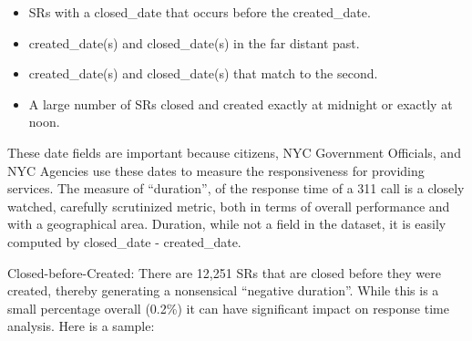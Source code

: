 \documentclass[12pt, titlepage]{article}
\begin{document}
\begin{itemize}
	\item SRs with a closed\_date that occurs before the created\_date.
 	\item created\_date(s) and closed\_date(s) in the far distant past.
 	\item created\_date(s) and closed\_date(s) that match to the second.
	\item A large number of SRs closed and created exactly at midnight 
	or exactly at noon. 
\end{itemize}
	
These date fields are important because citizens, NYC Government Officials, 
and NYC Agencies use these dates to measure the 
responsiveness for providing services. The measure of ``duration'',	 
of the response time of a 311 call is a closely 
watched, carefully scrutinized metric, both in terms of overall performance 
and with a geographical area. Duration, while not a field in the dataset, 
it is easily computed by closed\_date - created\_date.
	
Closed-before-Created:  There are 12,251 SRs that are closed before they 
were created, thereby generating a nonsensical ``negative duration''. 
While this is a small percentage overall (0.2\%) it can have significant impact 
on response time analysis. Here is a sample:
	
\end{document}
